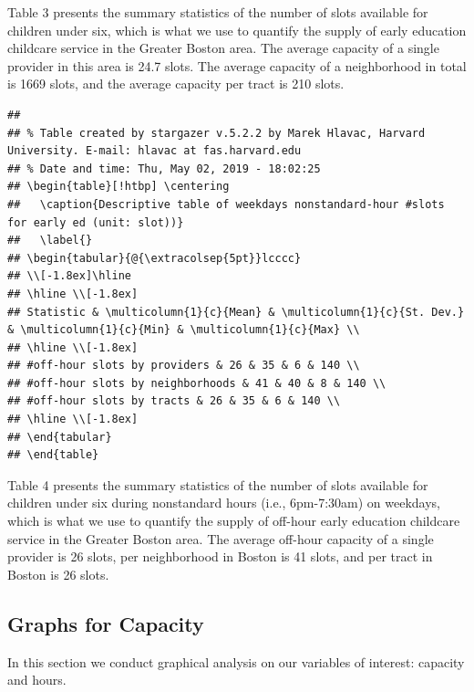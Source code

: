 \documentclass[10pt,letterpaper]{article}
\begin{document}
Table 3 presents the summary statistics of the number of slots available
for children under six, which is what we use to quantify the supply of
early education childcare service in the Greater Boston area. The
average capacity of a single provider in this area is 24.7 slots. The
average capacity of a neighborhood in total is 1669 slots, and the
average capacity per tract is 210 slots.

\begin{verbatim}
## 
## % Table created by stargazer v.5.2.2 by Marek Hlavac, Harvard University. E-mail: hlavac at fas.harvard.edu
## % Date and time: Thu, May 02, 2019 - 18:02:25
## \begin{table}[!htbp] \centering 
##   \caption{Descriptive table of weekdays nonstandard-hour #slots for early ed (unit: slot))} 
##   \label{} 
## \begin{tabular}{@{\extracolsep{5pt}}lcccc} 
## \\[-1.8ex]\hline 
## \hline \\[-1.8ex] 
## Statistic & \multicolumn{1}{c}{Mean} & \multicolumn{1}{c}{St. Dev.} & \multicolumn{1}{c}{Min} & \multicolumn{1}{c}{Max} \\ 
## \hline \\[-1.8ex] 
## #off-hour slots by providers & 26 & 35 & 6 & 140 \\ 
## #off-hour slots by neighborhoods & 41 & 40 & 8 & 140 \\ 
## #off-hour slots by tracts & 26 & 35 & 6 & 140 \\ 
## \hline \\[-1.8ex] 
## \end{tabular} 
## \end{table}
\end{verbatim}

Table 4 presents the summary statistics of the number of slots available
for children under six during nonstandard hours (i.e., 6pm-7:30am) on
weekdays, which is what we use to quantify the supply of off-hour early
education childcare service in the Greater Boston area. The average
off-hour capacity of a single provider is 26 slots, per neighborhood in
Boston is 41 slots, and per tract in Boston is 26 slots.

\subsection{Graphs for Capacity}\label{graphs-for-capacity}

In this section we conduct graphical analysis on our variables of
interest: capacity and hours.
\end{document}
